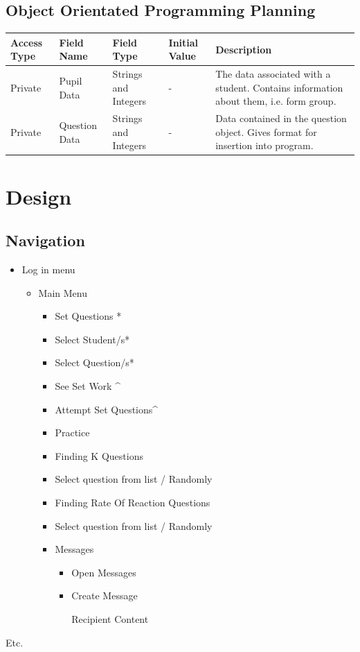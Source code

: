 \documentclass[a4paper,12pt]{report}
\begin{document}
\section{Object Orientated Programming Planning}

\begin{flushleft}
\tablefirsthead{}
\tablehead{}
\tabletail{}
\tablelasttail{}
\begin{supertabular}{|m{0.81435984in}|m{1.0191599in}|m{0.8469598in}|m{0.9038598in}|m{2.43586in}|}
\hline
Access Type &
Field Name &
Field Type &
Initial Value &
Description\\\hline
Private &
Pupil Data &
Strings and Integers &
{}- &
The data associated with a student. Contains information about them, i.e. form group.\\\hline
Private &
Question Data &
Strings and Integers &
{}- &
Data contained in the question object. Gives format for insertion into program.\\\hline


\end{supertabular}
\end{flushleft}

\chapter{Design}
\section{Navigation}

\begin{itemize}
\item Log in menu

\begin{itemize}
\item Main Menu

\begin{itemize}
\item Set Questions *
\item Select Student/s*
\item Select Question/s*
\item See Set Work \^{}
\item Attempt Set Questions\^{}
\item Practice
\item Finding K Questions
\item Select question from list / Randomly
\item Finding Rate Of Reaction Questions
\item Select question from list / Randomly
\item Messages

\begin{itemize}
\item Open Messages
\item Create Message

Recipient
Content
\end{itemize}
\end{itemize}
\end{itemize}
\end{itemize}
Etc.
\end{document}
